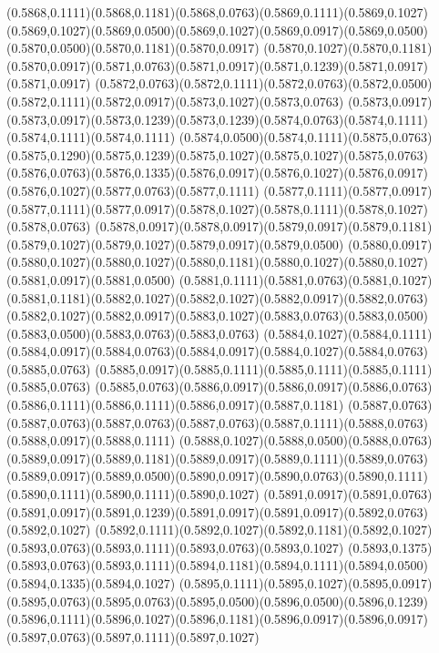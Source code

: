 (0.5868,0.1111)(0.5868,0.1181)(0.5868,0.0763)(0.5869,0.1111)(0.5869,0.1027)
\PST@Solid(0.5869,0.1027)(0.5869,0.0500)(0.5869,0.1027)(0.5869,0.0917)(0.5869,0.0500)(0.5870,0.0500)(0.5870,0.1181)(0.5870,0.0917)
(0.5870,0.1027)(0.5870,0.1181)(0.5870,0.0917)(0.5871,0.0763)(0.5871,0.0917)(0.5871,0.1239)(0.5871,0.0917)(0.5871,0.0917)
(0.5872,0.0763)(0.5872,0.1111)(0.5872,0.0763)(0.5872,0.0500)(0.5872,0.1111)(0.5872,0.0917)(0.5873,0.1027)(0.5873,0.0763)
(0.5873,0.0917)(0.5873,0.0917)(0.5873,0.1239)(0.5873,0.1239)(0.5874,0.0763)(0.5874,0.1111)(0.5874,0.1111)(0.5874,0.1111)
(0.5874,0.0500)(0.5874,0.1111)(0.5875,0.0763)(0.5875,0.1290)(0.5875,0.1239)(0.5875,0.1027)(0.5875,0.1027)(0.5875,0.0763)
(0.5876,0.0763)(0.5876,0.1335)(0.5876,0.0917)(0.5876,0.1027)(0.5876,0.0917)(0.5876,0.1027)(0.5877,0.0763)(0.5877,0.1111)
(0.5877,0.1111)(0.5877,0.0917)(0.5877,0.1111)(0.5877,0.0917)(0.5878,0.1027)(0.5878,0.1111)(0.5878,0.1027)(0.5878,0.0763)
(0.5878,0.0917)(0.5878,0.0917)(0.5879,0.0917)(0.5879,0.1181)(0.5879,0.1027)(0.5879,0.1027)(0.5879,0.0917)(0.5879,0.0500)
(0.5880,0.0917)(0.5880,0.1027)(0.5880,0.1027)(0.5880,0.1181)(0.5880,0.1027)(0.5880,0.1027)(0.5881,0.0917)(0.5881,0.0500)
(0.5881,0.1111)(0.5881,0.0763)(0.5881,0.1027)(0.5881,0.1181)(0.5882,0.1027)(0.5882,0.1027)(0.5882,0.0917)(0.5882,0.0763)
(0.5882,0.1027)(0.5882,0.0917)(0.5883,0.1027)(0.5883,0.0763)(0.5883,0.0500)(0.5883,0.0500)(0.5883,0.0763)(0.5883,0.0763)
(0.5884,0.1027)(0.5884,0.1111)(0.5884,0.0917)(0.5884,0.0763)(0.5884,0.0917)(0.5884,0.1027)(0.5884,0.0763)(0.5885,0.0763)
(0.5885,0.0917)(0.5885,0.1111)(0.5885,0.1111)(0.5885,0.1111)(0.5885,0.0763)
\PST@Solid(0.5885,0.0763)(0.5886,0.0917)(0.5886,0.0917)(0.5886,0.0763)(0.5886,0.1111)(0.5886,0.1111)(0.5886,0.0917)(0.5887,0.1181)
(0.5887,0.0763)(0.5887,0.0763)(0.5887,0.0763)(0.5887,0.0763)(0.5887,0.1111)(0.5888,0.0763)(0.5888,0.0917)(0.5888,0.1111)
(0.5888,0.1027)(0.5888,0.0500)(0.5888,0.0763)(0.5889,0.0917)(0.5889,0.1181)(0.5889,0.0917)(0.5889,0.1111)(0.5889,0.0763)
(0.5889,0.0917)(0.5889,0.0500)(0.5890,0.0917)(0.5890,0.0763)(0.5890,0.1111)(0.5890,0.1111)(0.5890,0.1111)(0.5890,0.1027)
(0.5891,0.0917)(0.5891,0.0763)(0.5891,0.0917)(0.5891,0.1239)(0.5891,0.0917)(0.5891,0.0917)(0.5892,0.0763)(0.5892,0.1027)
(0.5892,0.1111)(0.5892,0.1027)(0.5892,0.1181)(0.5892,0.1027)(0.5893,0.0763)(0.5893,0.1111)(0.5893,0.0763)(0.5893,0.1027)
(0.5893,0.1375)(0.5893,0.0763)(0.5893,0.1111)(0.5894,0.1181)(0.5894,0.1111)(0.5894,0.0500)(0.5894,0.1335)(0.5894,0.1027)
(0.5895,0.1111)(0.5895,0.1027)(0.5895,0.0917)(0.5895,0.0763)(0.5895,0.0763)(0.5895,0.0500)(0.5896,0.0500)(0.5896,0.1239)
(0.5896,0.1111)(0.5896,0.1027)(0.5896,0.1181)(0.5896,0.0917)(0.5896,0.0917)(0.5897,0.0763)(0.5897,0.1111)(0.5897,0.1027)
